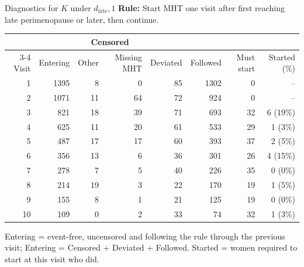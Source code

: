 \documentclass[11pt, xcolor={dvipsnames}, usepdftitle=false]{beamer}
\begin{document}
\begin{frame}{Diagnostics for $K$ under $d_\text{late}, 1$}
\centering
{\small \textbf{Rule:} Start MHT one visit after first reaching late perimenopause or later, then continue.}\par\vspace{6pt}
{\scriptsize
\begin{tabular}{r r r r r r r r}
\toprule
 & & \multicolumn{2}{c}{Censored} & & & & \\
\cmidrule(lr){3-4}
Visit & Entering & Other & Missing MHT & Deviated & Followed & Must start & Started (\%) \\
\midrule
1 & 1395 & 8 & 0 & 85 & 1302 & 0 & -- \\
2 & 1071 & 11 & 64 & 72 & 924 & 0 & -- \\
3 & 821 & 18 & 39 & 71 & 693 & 32 & 6 (19\%) \\
4 & 625 & 11 & 20 & 61 & 533 & 29 & 1 (3\%) \\
5 & 487 & 17 & 17 & 60 & 393 & 37 & 2 (5\%) \\
6 & 356 & 13 & 6 & 36 & 301 & 26 & 4 (15\%) \\
7 & 278 & 7 & 5 & 40 & 226 & 35 & 0 (0\%) \\
8 & 214 & 19 & 3 & 22 & 170 & 19 & 1 (5\%) \\
9 & 155 & 8 & 1 & 21 & 125 & 19 & 0 (0\%) \\
10 & 109 & 0 & 2 & 33 & 74 & 32 & 1 (3\%) \\
\bottomrule
\end{tabular}}
\par\vspace{6pt}
{\tiny Entering = event-free, uncensored and following the rule through the previous visit; Entering = Censored + Deviated + Followed. Started = women required to start at this visit who did.}
\end{frame}
\end{document}
